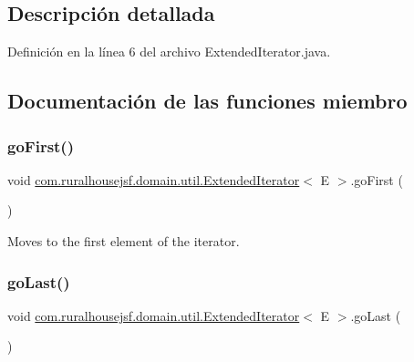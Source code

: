 \subsection{Descripción detallada}


Definición en la línea 6 del archivo Extended\+Iterator.\+java.



\subsection{Documentación de las funciones miembro}
\mbox{\label{interfacecom_1_1ruralhousejsf_1_1domain_1_1util_1_1_extended_iterator_a1a2554fbed6834a638e31a23b739a684}} 
\subsubsection{\texorpdfstring{goFirst()}{goFirst()}}
{\footnotesize\ttfamily void \mbox{\hyperlink{interfacecom_1_1ruralhousejsf_1_1domain_1_1util_1_1_extended_iterator}{com.\+ruralhousejsf.\+domain.\+util.\+Extended\+Iterator}}$<$ E $>$.go\+First (\begin{DoxyParamCaption}{ }\end{DoxyParamCaption})}



Moves to the first element of the iterator. 

\mbox{\label{interfacecom_1_1ruralhousejsf_1_1domain_1_1util_1_1_extended_iterator_a055883d2a28df4ac0da7476a2a773f36}} 
\subsubsection{\texorpdfstring{goLast()}{goLast()}}
{\footnotesize\ttfamily void \mbox{\hyperlink{interfacecom_1_1ruralhousejsf_1_1domain_1_1util_1_1_extended_iterator}{com.\+ruralhousejsf.\+domain.\+util.\+Extended\+Iterator}}$<$ E $>$.go\+Last (\begin{DoxyParamCaption}{ }\end{DoxyParamCaption})}



